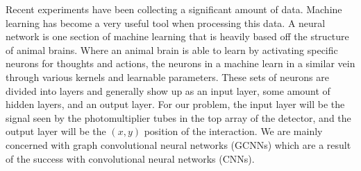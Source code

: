 \documentclass[thesis.tex]{subfiles}
\begin{document}
Recent experiments have been collecting a significant amount of data.
Machine learning has become a very useful tool when processing this data.
A neural network is one section of machine learning that is heavily based off the structure of animal brains.
Where an animal brain is able to learn by activating specific neurons for thoughts and actions, the neurons in a machine learn in a similar vein through various kernels and learnable parameters.
These sets of neurons are divided into layers and generally show up as an input layer, some amount of hidden layers, and an output layer.
For our problem, the input layer will be the signal seen by the photomultiplier tubes in the top array of the detector, and the output layer will be the $(x,y)$ position of the interaction.
We are mainly concerned with graph convolutional neural networks (GCNNs) which are a result of the success with convolutional neural networks (CNNs).
\end{document}
